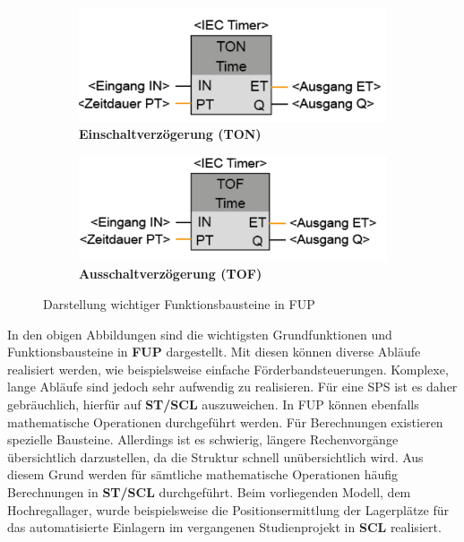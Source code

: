 \begin{figure}[H]
	\begin{subfigure}[b]{0.49\textwidth}
		\centering
		\includegraphics[width=0.8\linewidth]{images/TON}
		\caption{\textbf{Einschaltverzögerung (TON)} \cite{Hering}}
	\end{subfigure}
	\hfill
	\begin{subfigure}[b]{0.49\textwidth}
		\centering
		\includegraphics[width=0.8\linewidth]{images/TOF}
		\caption{\textbf{Ausschaltverzögerung (TOF)} \cite{Hering}}
	\end{subfigure}
	\caption{Darstellung wichtiger Funktionsbausteine in FUP}
	\label{fig:funktionsbausteine_fup}
\end{figure}

In den obigen Abbildungen sind die wichtigsten Grundfunktionen und Funktionsbausteine in \textbf{FUP} dargestellt.  
Mit diesen können diverse Abläufe realisiert werden, wie beispielsweise einfache Förderbandsteuerungen.  
Komplexe, lange Abläufe sind jedoch sehr aufwendig zu realisieren. Für eine SPS ist es daher gebräuchlich, hierfür auf \textbf{ST/SCL} auszuweichen.  
In FUP können ebenfalls mathematische Operationen durchgeführt werden. Für Berechnungen existieren spezielle Bausteine. Allerdings ist es schwierig, längere Rechenvorgänge übersichtlich darzustellen, da die Struktur schnell unübersichtlich wird.  
Aus diesem Grund werden für sämtliche mathematische Operationen häufig Berechnungen in \textbf{ST/SCL} durchgeführt.  
Beim vorliegenden Modell, dem Hochregallager, wurde beispielsweise die Positionsermittlung der Lagerplätze für das automatisierte Einlagern im vergangenen Studienprojekt in \textbf{SCL} realisiert.
